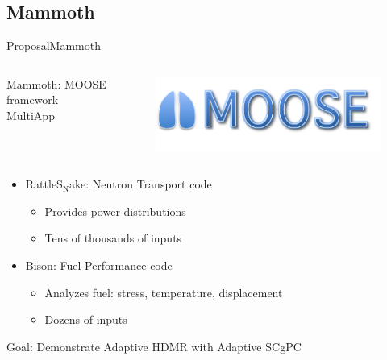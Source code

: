 \documentclass{beamer}
\begin{document}
\subsection{Mammoth}
\begin{frame}{Proposal}{Mammoth}\vspace{-20pt}
  \begin{columns}
  \begin{column}{0.7\linewidth}
  Mammoth: MOOSE framework MultiApp
  \end{column}
  \begin{column}{0.3\linewidth}
    \begin{figure}[h!]
      \centering
      \includegraphics[width=\textwidth]{../../graphics/moose_multiphysics}
    \end{figure}
  \end{column}
  \end{columns}
  \begin{itemize}
    \item RattleS$_\text{N}$ake: Neutron Transport code
      \begin{itemize}
        \item Provides power distributions
        \item Tens of thousands of inputs
      \end{itemize}
    \item Bison: Fuel Performance code
      \begin{itemize}
        \item Analyzes fuel: stress, temperature, displacement
        \item Dozens of inputs
      \end{itemize}
  \end{itemize}
  \vspace{10pt}
  Goal: Demonstrate Adaptive HDMR with Adaptive SCgPC
\end{frame}
\end{document}
